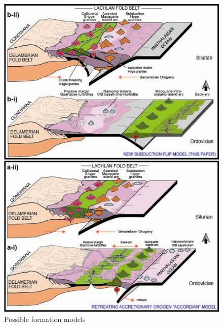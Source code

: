 \documentclass[a4paper]{article}
\begin{document}
\begin{figure}[H]
\centering
\includegraphics[width=1\textwidth]{granite_models.jpg}
\caption{\label{fig:GraniteModels} Possible formation models}
\end{figure}
\end{document}
